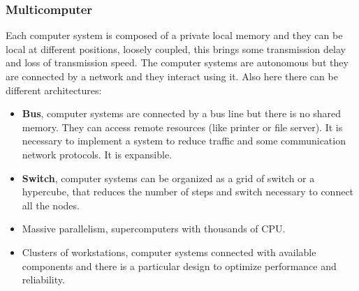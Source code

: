 \documentclass[11pt,a4paper]{article}
\begin{document}
\subsubsection{Multicomputer}
Each computer system is composed of a private local memory and they can be local at different positions, loosely coupled, this brings some transmission delay and loss of transmission speed. The computer systems are autonomous but they are connected by a network and they interact using it. Also here there can be different architectures:
\begin{itemize}
    \item \textbf{Bus}, computer systems are connected by a bus line but there is no shared memory. They can access remote resources (like printer or file server). It is necessary to implement a system to reduce traffic and some communication network protocols. It is expansible.
    \item \textbf{Switch}, computer systems can be organized as a grid of switch or a hypercube, that reduces the number of steps and switch necessary to connect all the nodes.
    \item Massive parallelism, supercomputers with thousands of CPU.
    \item Clusters of workstations, computer systems connected with available components and there is a particular design to optimize performance and reliability. 
\end{itemize}
\end{document}
